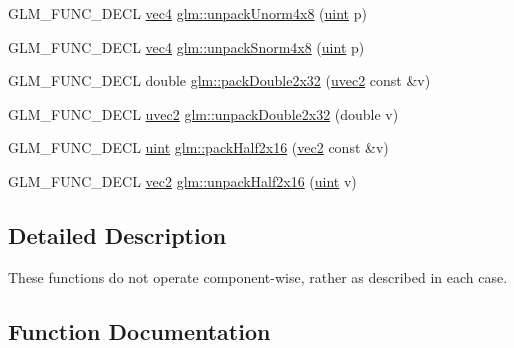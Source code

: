 \begin{DoxyCompactItemize}
\item 
G\+L\+M\+\_\+\+F\+U\+N\+C\+\_\+\+D\+E\+CL \hyperlink{group__core__types_ga5881b1b022d7fd1b7218f5916532dd02}{vec4} \hyperlink{group__core__func__packing_ga1ec646af4b27982d175672bddd642792}{glm\+::unpack\+Unorm4x8} (\hyperlink{group__core__precision_ga4fd29415871152bfb5abd588334147c8}{uint} p)
\item 
G\+L\+M\+\_\+\+F\+U\+N\+C\+\_\+\+D\+E\+CL \hyperlink{group__core__types_ga5881b1b022d7fd1b7218f5916532dd02}{vec4} \hyperlink{group__core__func__packing_ga4b18a0480e7260401d97f40cacd6bc36}{glm\+::unpack\+Snorm4x8} (\hyperlink{group__core__precision_ga4fd29415871152bfb5abd588334147c8}{uint} p)
\item 
G\+L\+M\+\_\+\+F\+U\+N\+C\+\_\+\+D\+E\+CL double \hyperlink{group__core__func__packing_gaf728fdfb98ce34da6f968d9f6bf154d7}{glm\+::pack\+Double2x32} (\hyperlink{group__core__types_gafd2041b45eff671aa8899d2c2835eee9}{uvec2} const \&v)
\item 
G\+L\+M\+\_\+\+F\+U\+N\+C\+\_\+\+D\+E\+CL \hyperlink{group__core__types_gafd2041b45eff671aa8899d2c2835eee9}{uvec2} \hyperlink{group__core__func__packing_gaea67aa4d065175e7746b2a8a2d00cedb}{glm\+::unpack\+Double2x32} (double v)
\item 
G\+L\+M\+\_\+\+F\+U\+N\+C\+\_\+\+D\+E\+CL \hyperlink{group__core__precision_ga4fd29415871152bfb5abd588334147c8}{uint} \hyperlink{group__core__func__packing_ga082f6dd65f73a547ed3067ef00be036f}{glm\+::pack\+Half2x16} (\hyperlink{group__core__types_gaa1618f51db67eaa145db101d8c8431d8}{vec2} const \&v)
\item 
G\+L\+M\+\_\+\+F\+U\+N\+C\+\_\+\+D\+E\+CL \hyperlink{group__core__types_gaa1618f51db67eaa145db101d8c8431d8}{vec2} \hyperlink{group__core__func__packing_ga90be544929ed83fa7039208bbab8c0ba}{glm\+::unpack\+Half2x16} (\hyperlink{group__core__precision_ga4fd29415871152bfb5abd588334147c8}{uint} v)
\end{DoxyCompactItemize}


\subsection{Detailed Description}
These functions do not operate component-\/wise, rather as described in each case. 

\subsection{Function Documentation}
\mbox{\label{group__core__func__packing_gaf728fdfb98ce34da6f968d9f6bf154d7}} 
